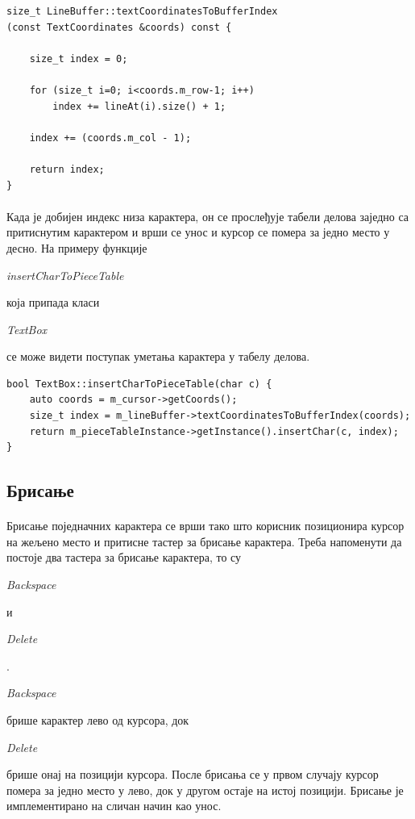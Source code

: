\documentclass[12pt,oneside]{memoir}
\begin{document}
\begin{verbatim}
size_t LineBuffer::textCoordinatesToBufferIndex
(const TextCoordinates &coords) const {
		
	size_t index = 0;
	
	for (size_t i=0; i<coords.m_row-1; i++)
		index += lineAt(i).size() + 1;
	
	index += (coords.m_col - 1);
	
	return index;
}
\end{verbatim}

\paragraph{}
Када је добијен индекс низа карактера, он се прослеђује табели делова заједно са  притиснутим карактером и врши се унос и курсор се помера за једно место у десно. 
На примеру функције 
\begin{latinica}\textit{insertCharToPieceTable}\end{latinica} која припада класи
\begin{latinica}\textit{TextBox}\end{latinica} се може видети поступак уметања
карактера у табелу делова.

\begin{verbatim}
bool TextBox::insertCharToPieceTable(char c) {
	auto coords = m_cursor->getCoords();
	size_t index = m_lineBuffer->textCoordinatesToBufferIndex(coords);
	return m_pieceTableInstance->getInstance().insertChar(c, index);
}
\end{verbatim}


\subsection{Брисање}
\paragraph{}
Брисање поједначних карактера се врши тако што корисник позиционира курсор
на жељено место и притисне тастер за брисање карактера. Треба напоменути да 
постоје два тастера за брисање карактера, то су \begin{latinica}\textit{Backspace}\end{latinica}
и \begin{latinica}\textit{Delete}\end{latinica}.
\begin{latinica}\textit{Backspace}\end{latinica} брише карактер лево од курсора,
док \begin{latinica}\textit{Delete}\end{latinica} брише онај на позицији курсора.
После брисања се у првом случају курсор помера за једно место у лево, док у другом
остаје на истој позицији. Брисање је имплементирано на сличан начин као унос.
\end{document}
